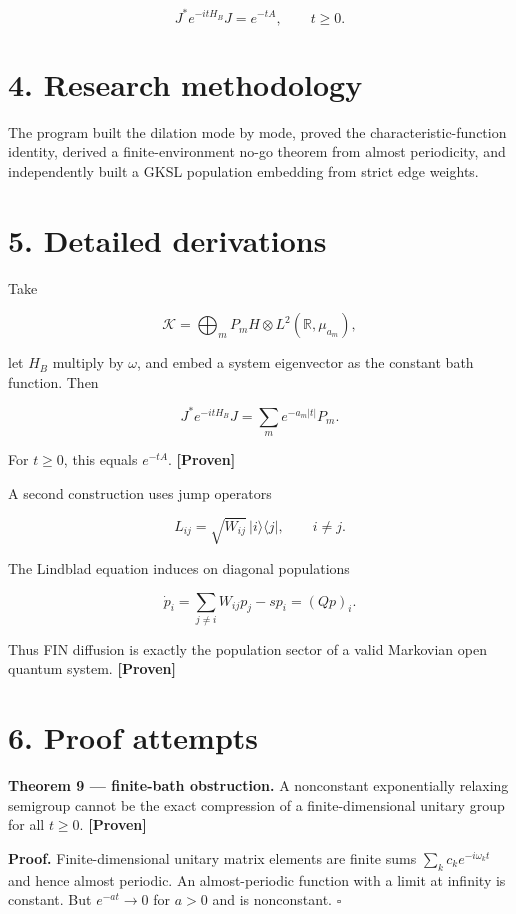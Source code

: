 \documentclass[11pt,a4paper,openany]{report}
\newcommand{\statusProven}{\textcolor{fingreen}{[Proven]}}
\begin{document}
\[
J^*e^{-itH_B}J=e^{-tA},\qquad t\ge0.
\]

\section{4. Research methodology}

The program built the dilation mode by mode, proved the characteristic-function identity, derived a finite-environment no-go theorem from almost periodicity, and independently built a GKSL population embedding from strict edge weights.

\section{5. Detailed derivations}

Take

\[
\mathcal K=
\bigoplus_m P_mH\otimes L^2(\mathbb R,\mu_{a_m}),
\]

let \(H_B\) multiply by \(\omega\), and embed a system eigenvector as the constant bath function. Then

\[
J^*e^{-itH_B}J
=\sum_me^{-a_m|t|}P_m.
\]

For \(t\ge0\), this equals \(e^{-tA}\). \textbf{\statusProven{}}

A second construction uses jump operators

\[
L_{ij}=\sqrt{W_{ij}}\,|i\rangle\langle j|,\qquad i\ne j.
\]

The Lindblad equation induces on diagonal populations

\[
\dot p_i=\sum_{j\ne i}W_{ij}p_j-sp_i=(Qp)_i.
\]

Thus FIN diffusion is exactly the population sector of a valid Markovian open quantum system. \textbf{\statusProven{}}

\section{6. Proof attempts}

\textbf{Theorem 9 — finite-bath obstruction.} A nonconstant exponentially relaxing semigroup cannot be the exact compression of a finite-dimensional unitary group for all \(t\ge0\). \textbf{\statusProven{}}

\textbf{Proof.} Finite-dimensional unitary matrix elements are finite sums \(\sum_kc_ke^{-i\omega_kt}\) and hence almost periodic. An almost-periodic function with a limit at infinity is constant. But \(e^{-at}\to0\) for \(a>0\) and is nonconstant. \(\square\)
\end{document}
